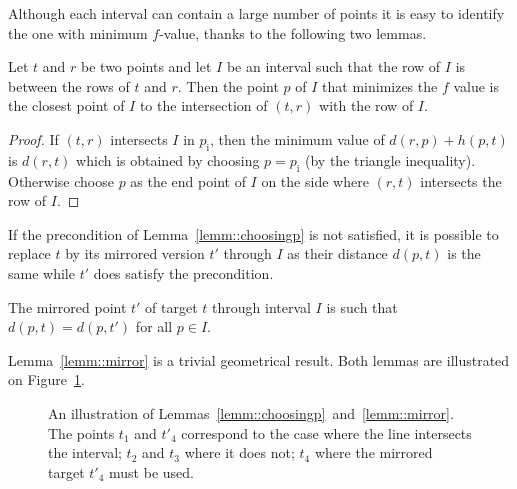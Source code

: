 Although each interval can contain a large number of points it is easy to
identify the one with minimum $f$-value, 
thanks to the following two lemmas.  

\begin{lemm}\label{lemm::choosingp}
  Let $t$ and $r$ be two points 
  and let $I$ be an interval 
  such that the row of $I$ is between the rows of $t$ and $r$.  
  Then the point $p$ of $I$ 
  that minimizes the $f$ value 
  is the closest point of $I$ to the intersection of $(t,r)$ 
  with the row of $I$.  
\end{lemm}

\begin{proof}
  If $(t,r)$ intersects $I$ in $p_\mathrm{i}$, 
  then the minimum value of $d(r,p) + h(p,t)$ 
  is $d(r,t)$ which is obtained 
  by choosing $p = p_{\mathrm{i}}$ (by the triangle inequality).  
  Otherwise choose $p$ as the end point of $I$ 
  on the side where $(r,t)$ intersects the row of $I$.  
\end{proof}

If the precondition of Lemma~\ref{lemm::choosingp} is not satisfied, 
it is possible to replace $t$ by its mirrored version $t'$ through $I$ 
as their distance $d(p,t)$ is the same 
while $t'$ does satisfy the precondition.  

\begin{lemm}
\label{lemm::mirror}
  The mirrored point $t'$ of target $t$ 
  through interval $I$ is such that   
  $d(p,t) = d(p,t')$ for all $p \in I$.  
\end{lemm}

Lemma~\ref{lemm::mirror} is a trivial geometrical result.  
Both lemmas are illustrated on Figure~\ref{fig::minf}.  


\begin{figure}[tb]
  \begin{center}
    
  \end{center}
  \caption{An illustration of Lemmas~\ref{lemm::choosingp}~and~\ref{lemm::mirror}.  The points $t_1$ and $t'_4$ correspond to the case 
where the line intersects the interval; 
$t_2$ and $t_3$ where it does not; 
$t_4$ where the mirrored target $t'_4$ must be used.
}
\label{fig::minf}
\end{figure}

